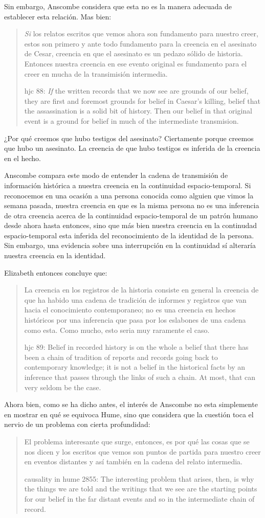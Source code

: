 Sin embargo, Anscombe considera que esta no es la manera adecuada de establecer
esta relación. Mas bien: \blockquote[hjc 88: \emph{If} the written records that
we now see are grounds of our belief, they are first and foremost grounds for
belief in Caesar's killing, belief that the assassination is a solid bit of
history. Then our belief in that original event is a ground for belief in much
of the intermediate transmision.]{\emph{Si} los relatos escritos que vemos ahora
  son fundamento para nuestro creer, estos son primero y ante todo fundamento
  para la creencia en el asesinato de Cesar, creencia en que el asesinato es un
  pedazo sólido de historia. Entonces nuestra creencia en ese evento original es
  fundamento para el creer en mucha de la transimisión intermedia.}
¿Por qué creemos que hubo testigos del asesinato? Ciertamente porque creemos que
hubo un asesinato. La creencia de que hubo testigos es inferida de la creencia
en el hecho.

Anscombe compara este modo de entender la cadena de transmisión de información
histórica a nuestra creencia en la continuidad espacio-temporal. Si reconocemos
en una ocasión a una persona conocida como alguien que vimos la semana pasada,
nuestra creencia en que es la misma persona no es una inferencia de otra
creencia acerca de la continuidad espacio-temporal de un patrón humano desde
ahora hasta entonces, sino que más bien nuestra creencia en la continudad
espacio-temporal esta inferida del reconocimiento de la identidad de la persona.
Sin embargo, una evidencia sobre una interrupción en la continuidad sí alteraría
nuestra creencia en la identidad.

Elizabeth entonces concluye que: \blockquote[hjc 89: Belief in recorded history is
on the whole a belief that there has been a chain of tradition of reports and
records going back to contemporary knowledge; it is not a belief in the
historical facts by an inference that passes through the links of such a chain.
At most, that can very seldom be the case.]{La creencia en los registros de la
  historia consiste en general la creencia de que ha habido una cadena de
  tradición de informes y registros que van hacia el conocimiento contemporaneo;
  no es una creencia en hechos históricos por una inferencia que pasa por los
  eslabones de una cadena como esta. Como mucho, esto seria muy raramente el
  caso.}

Ahora bien, como se ha dicho antes, el interés de Anscombe no esta simplemente
en mostrar en qué se equivoca Hume, sino que considera que la cuestión toca el
nervio de un problema con cierta profundidad:
\blockquote[causality in hume 2855: The interesting problem that arises, then,
is why the things we are told and the writings that we see are the starting
points for our belief in the far distant events and so in the intermediate chain
of record.]{El problema interesante que surge, entonces, es por qué las cosas
  que se nos dicen y los escritos que vemos son puntos de partida para nuestro
  creer en eventos distantes y así también en la cadena del relato intermedia.}



